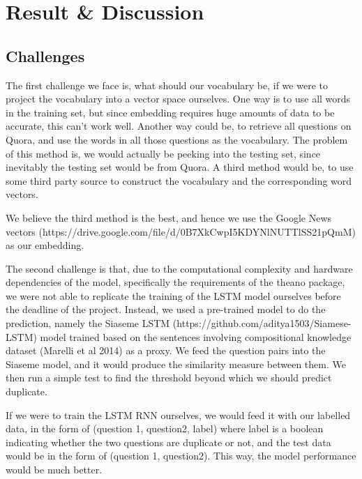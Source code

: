 \section{Result \& Discussion}


\subsection{Challenges}
The first challenge we face is, what should our vocabulary be, if we were to project the vocabulary into a vector space ourselves. One way is to use all words in the training set, but since embedding requires huge amounts of data to be accurate, this can't work well. Another way could be, to retrieve all questions on Quora, and use the words in all those questions as the vocabulary. The problem of this method is, we would actually be peeking into the testing set, since inevitably the testing set would be from Quora. A third method would be, to use some third party source to construct the vocabulary and the corresponding word vectors.

We believe the third method is the best, and hence we use the Google News vectors (https://drive.google.com/file/d/0B7XkCwpI5KDYNlNUTTlSS21pQmM) as our embedding.

The second challenge is that, due to the computational complexity and hardware dependencies of the model, specifically the requirements of the theano package, we were not able to replicate the training of the LSTM model ourselves before the deadline of the project. Instead, we used a pre-trained model to do the prediction, namely the Siaseme LSTM (https://github.com/aditya1503/Siamese-LSTM) model trained based on the sentences involving compositional knowledge dataset (Marelli et al 2014) as a proxy. We feed the question pairs into the Siaseme model, and it would produce the similarity measure between them. We then run a simple test to find the threshold beyond which we should predict duplicate.

If we were to train the LSTM RNN ourselves, we would feed it with our labelled data, in the form of (question 1, question2, label) where label is a boolean indicating whether the two questions are duplicate or not, and the test data would be in the form of (question 1, question2). This way, the model performance would be much better.